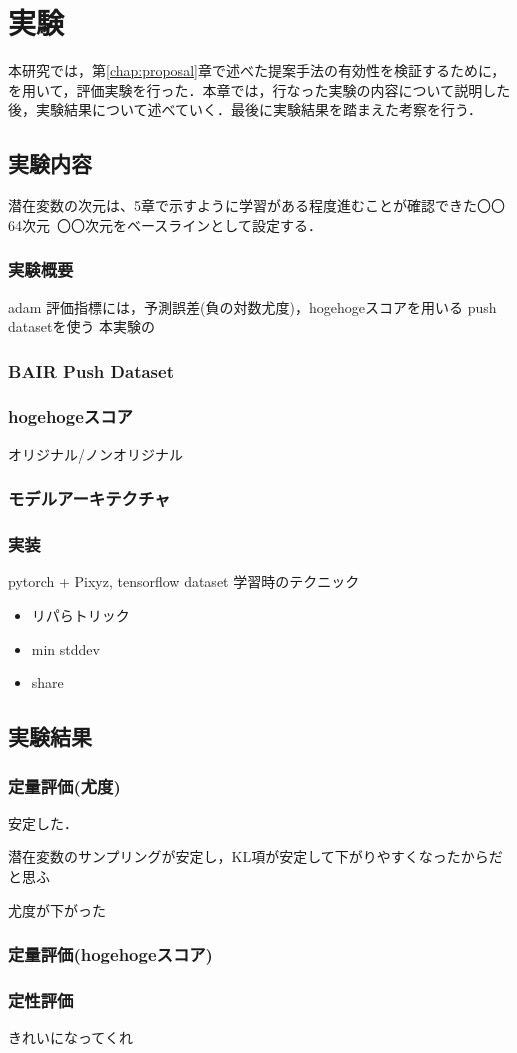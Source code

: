 \chapter{実験}
\label{chap:experiment}
本研究では，第\ref{chap:proposal}章で述べた提案手法の有効性を検証するために，を用いて，評価実験を行った．本章では，行なった実験の内容について説明した後，実験結果について述べていく．最後に実験結果を踏まえた考察を行う．

\section{実験内容}
潜在変数の次元は、5章で示すように学習がある程度進むことが確認できた〇〇64次元~〇〇次元をベースラインとして設定する．

\subsection{実験概要}
adam
評価指標には，予測誤差(負の対数尤度)，hogehogeスコアを用いる
push datasetを使う
本実験の

\subsection{BAIR Push Dataset}
\subsection{hogehogeスコア}
オリジナル/ノンオリジナル
\subsection{モデルアーキテクチャ}
\subsection{}
\subsection{実装}
pytorch + Pixyz, tensorflow dataset
学習時のテクニック
\begin{itemize}
    \item リパらトリック
    \item min stddev
    \item share
\end{itemize}

\section{実験結果}
\subsection{定量評価(尤度)}

安定した．

潜在変数のサンプリングが安定し，KL項が安定して下がりやすくなったからだと思ふ

尤度が下がった

\subsection{定量評価(hogehogeスコア)}
\subsection{定性評価}
きれいになってくれ